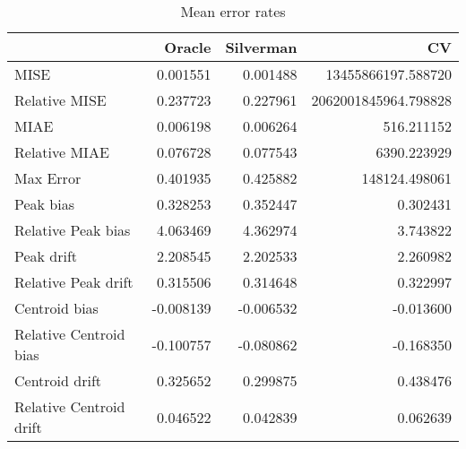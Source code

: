\begin{table}[ht]
\centering
\begin{tabular}{lrrr}
  \hline
 & Oracle & Silverman & CV \\ 
  \hline
MISE & 0.001551 & 0.001488 & 13455866197.588720 \\ 
  Relative MISE & 0.237723 & 0.227961 & 2062001845964.798828 \\ 
  MIAE & 0.006198 & 0.006264 & 516.211152 \\ 
  Relative MIAE & 0.076728 & 0.077543 & 6390.223929 \\ 
  Max Error & 0.401935 & 0.425882 & 148124.498061 \\ 
  Peak bias & 0.328253 & 0.352447 & 0.302431 \\ 
  Relative Peak bias & 4.063469 & 4.362974 & 3.743822 \\ 
  Peak drift & 2.208545 & 2.202533 & 2.260982 \\ 
  Relative Peak drift & 0.315506 & 0.314648 & 0.322997 \\ 
  Centroid bias & -0.008139 & -0.006532 & -0.013600 \\ 
  Relative Centroid bias & -0.100757 & -0.080862 & -0.168350 \\ 
  Centroid drift & 0.325652 & 0.299875 & 0.438476 \\ 
  Relative Centroid drift & 0.046522 & 0.042839 & 0.062639 \\ 
   \hline
\end{tabular}
\caption{Mean error rates} 
\label{tbl:mean_error_rates}
\end{table}
